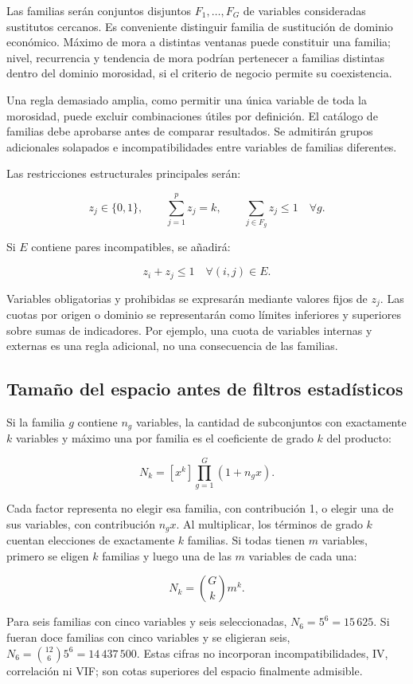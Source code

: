 \documentclass[11pt,letterpaper]{article}
\begin{document}
Las familias serán conjuntos disjuntos \(F_1,\ldots,F_G\) de variables consideradas sustitutos cercanos. Es conveniente distinguir familia de sustitución de dominio económico. Máximo de mora a distintas ventanas puede constituir una familia; nivel, recurrencia y tendencia de mora podrían pertenecer a familias distintas dentro del dominio morosidad, si el criterio de negocio permite su coexistencia.

Una regla demasiado amplia, como permitir una única variable de toda la morosidad, puede excluir combinaciones útiles por definición. El catálogo de familias debe aprobarse antes de comparar resultados. Se admitirán grupos adicionales solapados e incompatibilidades entre variables de familias diferentes.

Las restricciones estructurales principales serán:

\[
z_j\in\{0,1\},\qquad \sum_{j=1}^{p}z_j=k,\qquad
\sum_{j\in F_g}z_j\leq 1\quad \forall g.
\]

Si \(E\) contiene pares incompatibles, se añadirá:

\[
z_i+z_j\leq 1\quad \forall (i,j)\in E.
\]

Variables obligatorias y prohibidas se expresarán mediante valores fijos de \(z_j\). Las cuotas por origen o dominio se representarán como límites inferiores y superiores sobre sumas de indicadores. Por ejemplo, una cuota de variables internas y externas es una regla adicional, no una consecuencia de las familias.

\subsection{Tamaño del espacio antes de filtros estadísticos}\label{sec:3.1}

Si la familia \(g\) contiene \(n_g\) variables, la cantidad de subconjuntos con exactamente \(k\) variables y máximo una por familia es el coeficiente de grado \(k\) del producto:

\[
N_k=[x^k]\prod_{g=1}^{G}(1+n_gx).
\]

Cada factor representa no elegir esa familia, con contribución 1, o elegir una de sus variables, con contribución \(n_gx\). Al multiplicar, los términos de grado \(k\) cuentan elecciones de exactamente \(k\) familias. Si todas tienen \(m\) variables, primero se eligen \(k\) familias y luego una de las \(m\) variables de cada una:

\[
N_k=\binom{G}{k}m^k.
\]

Para seis familias con cinco variables y seis seleccionadas, \(N_6=5^6=15\,625\). Si fueran doce familias con cinco variables y se eligieran seis, \(N_6=\binom{12}{6}5^6=14\,437\,500\). Estas cifras no incorporan incompatibilidades, IV, correlación ni VIF; son cotas superiores del espacio finalmente admisible.
\end{document}
